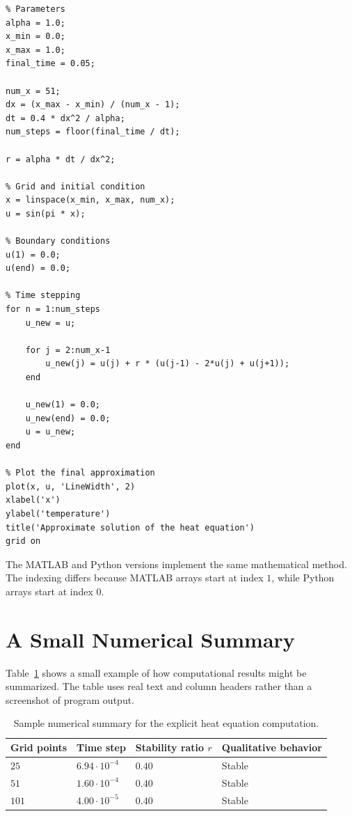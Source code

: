 \begin{verbatim}
% Parameters
alpha = 1.0;
x_min = 0.0;
x_max = 1.0;
final_time = 0.05;

num_x = 51;
dx = (x_max - x_min) / (num_x - 1);
dt = 0.4 * dx^2 / alpha;
num_steps = floor(final_time / dt);

r = alpha * dt / dx^2;

% Grid and initial condition
x = linspace(x_min, x_max, num_x);
u = sin(pi * x);

% Boundary conditions
u(1) = 0.0;
u(end) = 0.0;

% Time stepping
for n = 1:num_steps
    u_new = u;

    for j = 2:num_x-1
        u_new(j) = u(j) + r * (u(j-1) - 2*u(j) + u(j+1));
    end

    u_new(1) = 0.0;
    u_new(end) = 0.0;
    u = u_new;
end

% Plot the final approximation
plot(x, u, 'LineWidth', 2)
xlabel('x')
ylabel('temperature')
title('Approximate solution of the heat equation')
grid on
\end{verbatim}

The MATLAB and Python versions implement the same mathematical method. The indexing differs because MATLAB arrays start at index \(1\), while Python arrays start at index \(0\).

\section{A Small Numerical Summary}
\label{sec:numerical-summary}

Table~\ref{tab:computational-summary} shows a small example of how computational results might be summarized. The table uses real text and column headers rather than a screenshot of program output.

\begin{table}[htbp]
\caption{Sample numerical summary for the explicit heat equation computation.}
\label{tab:computational-summary}
\centering
\begin{tabular}{llll}
\toprule
Grid points & Time step & Stability ratio \(r\) & Qualitative behavior \\
\midrule
\(25\)  & \(6.94\cdot 10^{-4}\) & \(0.40\) & Stable \\
\(51\)  & \(1.60\cdot 10^{-4}\) & \(0.40\) & Stable \\
\(101\) & \(4.00\cdot 10^{-5}\) & \(0.40\) & Stable \\
\bottomrule
\end{tabular}
\end{table}

